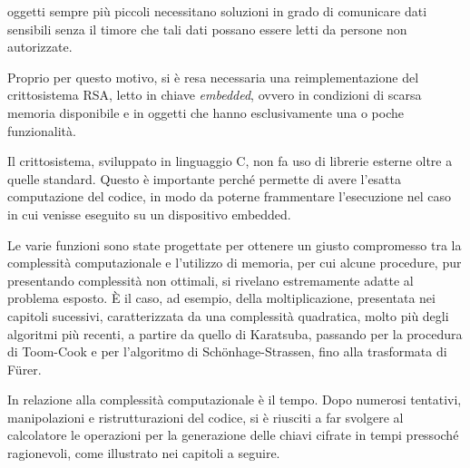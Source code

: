 
 oggetti sempre più piccoli necessitano soluzioni in grado di comunicare dati sensibili senza il timore che tali dati possano essere letti da persone non autorizzate.

Proprio per questo motivo, si è resa necessaria una reimplementazione del crittosistema RSA, letto in chiave \emph{embedded}, ovvero in condizioni di scarsa memoria disponibile e in oggetti che hanno esclusivamente una o poche funzionalità.

Il crittosistema, sviluppato in linguaggio C, non fa uso di librerie esterne oltre a quelle standard. Questo è importante perché permette di avere l'esatta computazione del codice, in modo da poterne frammentare l'esecuzione nel caso in cui venisse eseguito su un dispositivo embedded.

Le varie funzioni sono state progettate per ottenere un giusto compromesso tra la complessità computazionale e l'utilizzo di memoria, per cui alcune procedure, pur presentando complessità non ottimali, si rivelano estremamente adatte al problema esposto. È il caso, ad esempio, della moltiplicazione, presentata nei capitoli sucessivi, caratterizzata da una complessità quadratica, molto più degli algoritmi più recenti, a partire da quello di Karatsuba, passando per la procedura di Toom-Cook e per l'algoritmo di Sch\"onhage-Strassen, fino alla trasformata di F\"urer. 

In relazione alla complessità computazionale è il tempo. Dopo numerosi tentativi, manipolazioni e ristrutturazioni del codice, si è riusciti a far svolgere al calcolatore le operazioni per la generazione delle chiavi cifrate in tempi pressoché ragionevoli, come illustrato nei capitoli a seguire.

